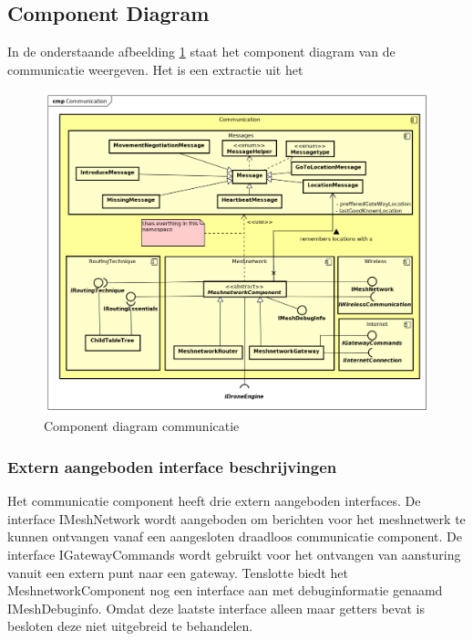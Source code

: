 \documentclass[a4paper, 11pt, oneside]{report}
\begin{document}
\subsection{Component Diagram}
\label{DetailedDesign:CommunicatieComponentDiagram}
In de onderstaande afbeelding \ref{fig:component:Communicatie} staat het component diagram van de communicatie weergeven.
Het is een extractie uit het  
\begin{figure}[H]
	\begin{center}\includegraphics[width=\linewidth]{Afbeeldingen/CommunicationComponentDiagram.png}\end{center}
	\caption{Component diagram communicatie}
	\label{fig:component:Communicatie}
\end{figure}

\subsubsection{Extern aangeboden interface beschrijvingen}
\label{DetailedDesign:CommunicatieComponentDiagram:interface:extern}
Het communicatie component heeft drie extern aangeboden interfaces. De interface IMeshNetwork wordt aangeboden om berichten voor het meshnetwerk te kunnen ontvangen vanaf een aangesloten draadloos communicatie component. De interface IGatewayCommands wordt gebruikt voor het ontvangen van aansturing vanuit een extern punt naar een gateway. Tenslotte biedt het MeshnetworkComponent nog een interface aan met debuginformatie genaamd IMeshDebuginfo. Omdat deze laatste interface alleen maar getters bevat is besloten deze niet uitgebreid te behandelen.
\end{document}
